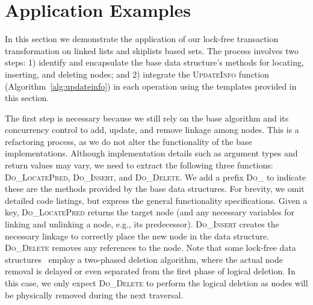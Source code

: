 \documentclass[]{sig-alternate-05-2015}
\begin{document}
\section{Application Examples}
\label{sec:application}
In this section we demonstrate the application of our lock-free transaction transformation on linked lists and skiplists based sets. 
The process involves two steps: 1) identify and encapsulate the base data structure's methods for locating, inserting, and deleting nodes; and 2) integrate the \textsc{UpdateInfo} function (Algorithm~\ref{alg:updateinfo}) in each operation using the templates provided in this section.

The first step is necessary because we still rely on the base algorithm and its concurrency control to add, update, and remove linkage among nodes.
This is a refactoring process, as we do not alter the functionality of the base implementations. 
Although implementation details such as argument types and return values may vary, we need to extract the following three functions: \textsc{Do\_LocatePred}, \textsc{Do\_Insert}, and \textsc{Do\_Delete}.
We add a prefix \textsc{Do\_} to indicate these are the methods provided by the base data structures.
For brevity, we omit detailed code listings, but express the general functionality specifications.
Given a key, \textsc{Do\_LocatePred} returns the target node (and any necessary variables for linking and unlinking a node, e.g., its predecessor).
\textsc{Do\_Insert} creates the necessary linkage to correctly place the new node in the data structure.
\textsc{Do\_Delete} removes any references to the node.
Note that some lock-free data structures~\cite{harris2001pragmatic,fraser2004practical} employ a two-phased deletion algorithm, where the actual node removal is delayed or even separated from the first phase of logical deletion.
In this case, we only expect \textsc{Do\_Delete} to perform the logical deletion as nodes will be physically removed during the next traversal.
\end{document}
